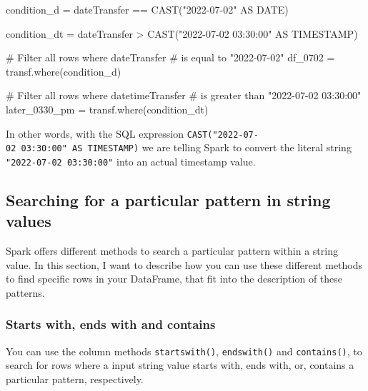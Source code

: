 \documentclass[
  11pt,
  letterpaper,
  DIV=11,
  numbers=noendperiod]{scrreprt}
\newenvironment{Shaded}{\begin{snugshade}}{\end{snugshade}}
\newcommand{\CommentTok}[1]{\textcolor[rgb]{0.37,0.37,0.37}{#1}}
\newcommand{\NormalTok}[1]{\textcolor[rgb]{0.00,0.23,0.31}{#1}}
\newcommand{\OperatorTok}[1]{\textcolor[rgb]{0.37,0.37,0.37}{#1}}
\newcommand{\StringTok}[1]{\textcolor[rgb]{0.13,0.47,0.30}{#1}}
\begin{document}
\begin{Shaded}
\begin{Highlighting}[]
\NormalTok{condition\_d }\OperatorTok{=} \StringTok{\textquotesingle{}\textquotesingle{}\textquotesingle{}}
\StringTok{dateTransfer == CAST("2022{-}07{-}02" AS DATE)}
\StringTok{\textquotesingle{}\textquotesingle{}\textquotesingle{}}

\NormalTok{condition\_dt }\OperatorTok{=} \StringTok{\textquotesingle{}\textquotesingle{}\textquotesingle{}}
\StringTok{dateTransfer \textgreater{} CAST("2022{-}07{-}02 03:30:00" AS TIMESTAMP)}
\StringTok{\textquotesingle{}\textquotesingle{}\textquotesingle{}}

\CommentTok{\# Filter all rows where \textasciigrave{}dateTransfer\textasciigrave{}}
\CommentTok{\# is equal to "2022{-}07{-}02"}
\NormalTok{df\_0702 }\OperatorTok{=}\NormalTok{ transf.where(condition\_d)}

\CommentTok{\# Filter all rows where \textasciigrave{}datetimeTransfer\textasciigrave{}}
\CommentTok{\# is greater than "2022{-}07{-}02 03:30:00"}
\NormalTok{later\_0330\_pm }\OperatorTok{=}\NormalTok{ transf.where(condition\_dt)}
\end{Highlighting}
\end{Shaded}

In other words, with the SQL expression
\texttt{CAST("2022-07-02\ 03:30:00"\ AS\ TIMESTAMP)} we are telling
Spark to convert the literal string \texttt{"2022-07-02\ 03:30:00"} into
an actual timestamp value.

\subsection{Searching for a particular pattern in string
values}\label{sec-filter-pattern-search}

Spark offers different methods to search a particular pattern within a
string value. In this section, I want to describe how you can use these
different methods to find specific rows in your DataFrame, that fit into
the description of these patterns.

\subsubsection{Starts with, ends with and
contains}\label{starts-with-ends-with-and-contains}

You can use the column methods \texttt{startswith()},
\texttt{endswith()} and \texttt{contains()}, to search for rows where a
input string value starts with, ends with, or, contains a particular
pattern, respectively.
\end{document}
